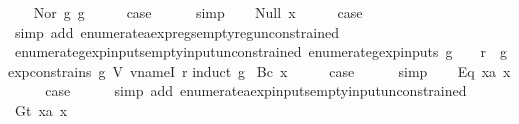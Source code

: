 \begin{isabellebody}
\isamarkupfalse%
\isanewline
\ \ \isamarkupfalse%
\ {\isacharparenleft}Nor\ g{}\ g{}{\isacharparenright}\isanewline
\ \ \isamarkupfalse%
\ \isamarkupfalse%
\ {\isacharquery}case\isanewline
\ \ \ \ \isamarkupfalse%
\ simp\isanewline
{}\isamarkupfalse%
\isanewline
\ \ \isamarkupfalse%
\ {\isacharparenleft}Null\ x{\isacharparenright}\isanewline
\ \ \isamarkupfalse%
\ \isamarkupfalse%
\ {\isacharquery}case\isanewline
\ \ \ \ \isamarkupfalse%
\ {\isacharparenleft}simp\ add{\isacharcolon}\ enumerate{\isacharunderscore}aexp{\isacharunderscore}regs{\isacharunderscore}empty{\isacharunderscore}reg{\isacharunderscore}unconstrained{\isacharparenright}\isanewline
{}\isamarkupfalse%
%
\endisatagproof
{\isafoldproof}%
%
\isadelimproof
\isanewline
%
\endisadelimproof
\isanewline
{}\isamarkupfalse%
\ enumerate{\isacharunderscore}gexp{\isacharunderscore}inputs{\isacharunderscore}empty{\isacharunderscore}input{\isacharunderscore}unconstrained{\isacharcolon}\ {\isachardoublequoteopen}enumerate{\isacharunderscore}gexp{\isacharunderscore}inputs\ g\ {\isacharequal}\ {\isacharbraceleft}{\isacharbraceright}\ {\isasymLongrightarrow}\ {\isasymforall}r{\isachardot}\ {\isasymnot}\ gexp{\isacharunderscore}constrains\ g\ {\isacharparenleft}V\ {\isacharparenleft}vname{\isachardot}I\ r{\isacharparenright}{\isacharparenright}{\isachardoublequoteclose}\isanewline
%
\isadelimproof
%
\endisadelimproof
%
\isatagproof
{}\isamarkupfalse%
{\isacharparenleft}induct\ g{\isacharparenright}\isanewline
{}\isamarkupfalse%
\ {\isacharparenleft}Bc\ x{\isacharparenright}\isanewline
\ \ \isamarkupfalse%
\ \isamarkupfalse%
\ {\isacharquery}case\isanewline
\ \ \ \ \isamarkupfalse%
\ simp\isanewline
{}\isamarkupfalse%
\isanewline
\ \ \isamarkupfalse%
\ {\isacharparenleft}Eq\ x{}a\ x{}{\isacharparenright}\isanewline
\ \ \isamarkupfalse%
\ \isamarkupfalse%
\ {\isacharquery}case\isanewline
\ \ \ \ \isamarkupfalse%
\ {\isacharparenleft}simp\ add{\isacharcolon}\ enumerate{\isacharunderscore}aexp{\isacharunderscore}inputs{\isacharunderscore}empty{\isacharunderscore}input{\isacharunderscore}unconstrained{\isacharparenright}\isanewline
{}\isamarkupfalse%
\isanewline
\ \ \isamarkupfalse%
\ {\isacharparenleft}Gt\ x{}a\ x{}{\isacharparenright}\isanewline

\end{isabellebody}
